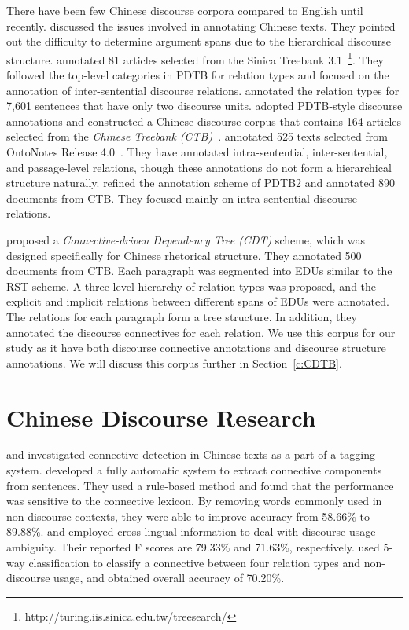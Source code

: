There have been few Chinese discourse corpora compared to English until recently.
\cite{xue2005annotating} discussed the issues involved in annotating Chinese texts. They
pointed out the difficulty to determine argument spans due to the hierarchical
discourse structure. \cite{huang2011chinese} annotated 81 articles selected from
the Sinica Treebank 3.1~\footnote{http://turing.iis.sinica.edu.tw/treesearch/}. They followed
the top-level categories in PDTB for relation types and focused on the annotation
of inter-sentential discourse relations. \cite{huang2014interpretation} annotated the
relation types for 7,601 sentences that have only two discourse units.
\cite{zhou2012pdtb,zhou2015the} adopted PDTB-style discourse annotations and constructed
a Chinese discourse corpus that contains 164 articles selected from the \textit{Chinese
Treebank (CTB)}~\citep{xue2005penn}. \cite{zhang2014chinese} annotated 525 texts selected
from OntoNotes Release 4.0~\citep{weischedel_ontonotes_2011}. They have annotated
intra-sentential, inter-sentential, and passage-level relations, though
these annotations do not form a hierarchical structure naturally. \cite{zhou2014the}
refined the annotation scheme of PDTB2 and annotated 890 documents from CTB.
They focused mainly on intra-sentential discourse relations.

\cite{li2014building} proposed a \textit{Connective-driven Dependency Tree (CDT)}
scheme, which was designed specifically for Chinese rhetorical structure. They
annotated 500 documents from CTB. Each paragraph was segmented into EDUs similar
to the RST scheme. A three-level hierarchy of relation types was
proposed, and the explicit and implicit relations between different spans of EDUs
were annotated. The relations for each paragraph form a tree structure. In addition,
they annotated the discourse connectives for each relation. We use this corpus
for our study as it have both discourse connective annotations and discourse
structure annotations. We will discuss this corpus further in Section~\ref{c:CDTB}.

\section{Chinese Discourse Research}


\cite{t1999applying,t2000enhancement} and \cite{chan2000mining} investigated
connective detection in Chinese texts as a part of a tagging system. \cite{hu2009research}
developed a fully automatic system to extract connective components from sentences.
They used a rule-based method and found that the performance was sensitive to
the connective lexicon. By removing words commonly used in non-discourse contexts,
they were able to improve accuracy from 58.66\% to 89.88\%.
\cite{zhou2012cross} and \cite{li2014cross} employed
cross-lingual information to deal with discourse usage ambiguity.
Their reported F scores are 79.33\% and 71.63\%, respectively.
\cite{li2014cross} used 5-way classification to classify a connective
between four relation types and non-discourse usage,
and obtained overall accuracy of 70.20\%.

